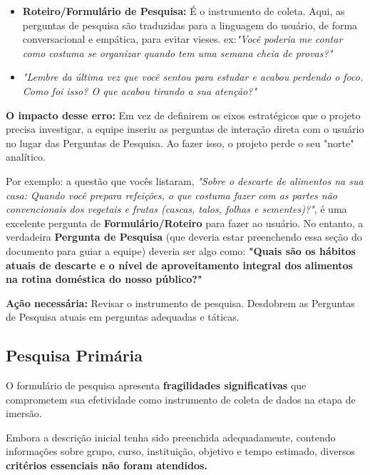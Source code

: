 \documentclass[
  sigconf,
  nonacm, %
  language=portuguese
]{acmart}
\newcommand{\statuswarn}[1]{{\small\bfseries\color{cwarn}#1}}
\begin{document}
\begin{itemize}[leftmargin=14pt,itemsep=2pt,topsep=4pt]
  \item \textbf{Roteiro/Formulário de Pesquisa:} É o instrumento de coleta. Aqui, as perguntas de pesquisa são traduzidas para a linguagem do usuário, de forma conversacional e empática, para evitar vieses. ex:\textit{"Você poderia me contar como costuma se organizar quando tem uma semana cheia de provas?"}
  \item \textit{"Lembre da última vez que você sentou para estudar e acabou perdendo o foco. Como foi isso? O que acabou tirando a sua atenção?"}
\end{itemize}

\textbf{O impacto desse erro:} Em vez de definirem os eixos estratégicos que o projeto precisa investigar, a equipe inseriu as perguntas de interação direta com o usuário no lugar das Perguntas de Pesquisa. Ao fazer isso, o projeto perde o seu "norte" analítico.

Por exemplo: a questão que vocês listaram, \textit{"Sobre o descarte de alimentos na sua casa: Quando você prepara refeições, o que costuma fazer com as partes não convencionais dos vegetais e frutas (cascas, talos, folhas e sementes)?"}, é uma excelente pergunta de \textbf{Formulário/Roteiro} para fazer ao usuário. No entanto, a verdadeira \textbf{Pergunta de Pesquisa} (que deveria estar preenchendo essa seção do documento para guiar a equipe) deveria ser algo como: \textbf{"Quais são os hábitos atuais de descarte e o nível de aproveitamento integral dos alimentos na rotina doméstica do nosso público?"}

\textbf{Ação necessária:} Revisar o instrumento de pesquisa. Desdobrem as Perguntas de Pesquisa atuais em perguntas adequadas e táticas.

\subsection{Pesquisa Primária}

\noindent\statuswarn{0,25\,/\,1,00 pts · Faltou muito e errou}

O formulário de pesquisa apresenta \textbf{fragilidades significativas }que comprometem sua efetividade como instrumento de coleta de dados na etapa de imersão.

Embora a descrição inicial tenha sido preenchida adequadamente, contendo informações sobre grupo, curso, instituição, objetivo e tempo estimado, diversos \textbf{critérios essenciais não foram atendidos.}
\end{document}
